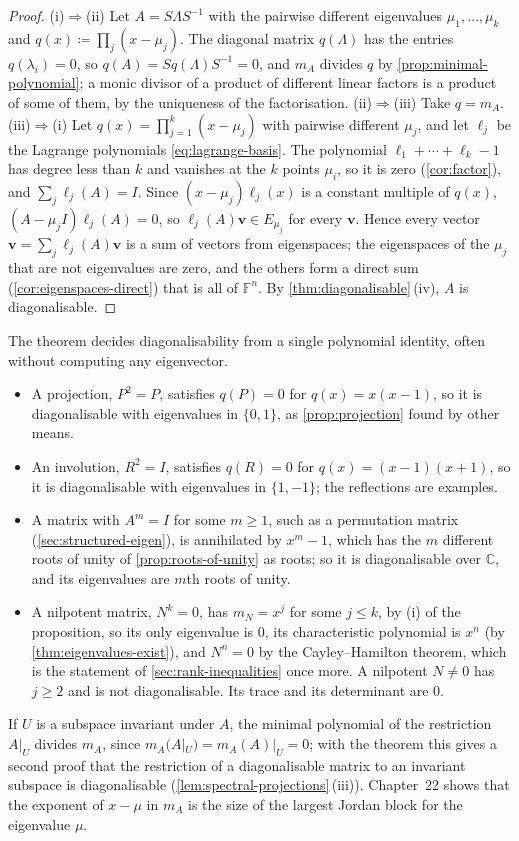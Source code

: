 \begin{proof}
(i)$\Rightarrow$(ii) Let $A=S\Lambda S^{-1}$ with the pairwise different eigenvalues $\mu_1,\ldots,\mu_k$ and $q(x)\coloneqq\prod_j(x-\mu_j)$. The diagonal matrix $q(\Lambda)$ has the entries $q(\lambda_i)=0$, so $q(A)=Sq(\Lambda)S^{-1}=0$, and $m_A$ divides $q$ by \cref{prop:minimal-polynomial}; a monic divisor of a product of different linear factors is a product of some of them, by the uniqueness of the factorisation. (ii)$\Rightarrow$(iii) Take $q=m_A$. (iii)$\Rightarrow$(i) Let $q(x)=\prod_{j=1}^k(x-\mu_j)$ with pairwise different $\mu_j$, and let $\ell_j$ be the Lagrange polynomials \eqref{eq:lagrange-basis}. The polynomial $\ell_1+\cdots+\ell_k-1$ has degree less than $k$ and vanishes at the $k$ points $\mu_i$, so it is zero (\cref{cor:factor}), and $\sum_j\ell_j(A)=I$. Since $(x-\mu_j)\ell_j(x)$ is a constant multiple of $q(x)$, $(A-\mu_jI)\ell_j(A)=0$, so $\ell_j(A)\mathbf v\in E_{\mu_j}$ for every $\mathbf v$. Hence every vector $\mathbf v=\sum_j\ell_j(A)\mathbf v$ is a sum of vectors from eigenspaces; the eigenspaces of the $\mu_j$ that are not eigenvalues are zero, and the others form a direct sum (\cref{cor:eigenspaces-direct}) that is all of $\mathbb F^n$. By \cref{thm:diagonalisable}\,(iv), $A$ is diagonalisable.
\end{proof}

The theorem decides diagonalisability from a single polynomial identity, often without computing any eigenvector.
\begin{itemize}
\item A projection, $P^2=P$, satisfies $q(P)=0$ for $q(x)=x(x-1)$, so it is diagonalisable with eigenvalues in $\{0,1\}$, as \cref{prop:projection} found by other means.
\item An involution, $R^2=I$, satisfies $q(R)=0$ for $q(x)=(x-1)(x+1)$, so it is diagonalisable with eigenvalues in $\{1,-1\}$; the reflections are examples.
\item A matrix with $A^m=I$ for some $m\ge1$, such as a permutation matrix (\cref{sec:structured-eigen}), is annihilated by $x^m-1$, which has the $m$ different roots of unity of \cref{prop:roots-of-unity} as roots; so it is diagonalisable over $\mathbb C$, and its eigenvalues are $m$th roots of unity.
\item A nilpotent matrix, $N^k=0$, has $m_N=x^j$ for some $j\le k$, by (i) of the proposition, so its only eigenvalue is $0$, its characteristic polynomial is $x^n$ (by \cref{thm:eigenvalues-exist}), and $N^n=0$ by the Cayley--Hamilton theorem, which is the statement of \cref{sec:rank-inequalities} once more. A nilpotent $N\ne0$ has $j\ge2$ and is not diagonalisable. Its trace and its determinant are $0$.
\end{itemize}
If $U$ is a subspace invariant under $A$, the minimal polynomial of the restriction $A|_U$ divides $m_A$, since $m_A(A|_U)=m_A(A)|_U=0$; with the theorem this gives a second proof that the restriction of a diagonalisable matrix to an invariant subspace is diagonalisable (\cref{lem:spectral-projections}\,(iii)). Chapter~22 shows that the exponent of $x-\mu$ in $m_A$ is the size of the largest Jordan block for the eigenvalue $\mu$.

